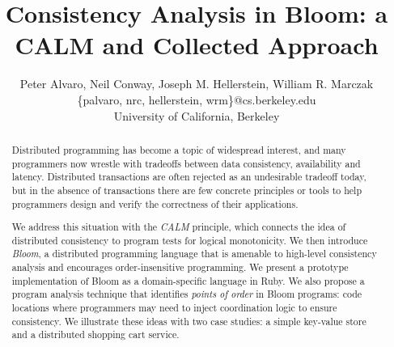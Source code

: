 \documentclass{sig-alternate}
\begin{document}
\title{Consistency Analysis in Bloom: a CALM and Collected Approach}

\author{
Peter Alvaro, Neil Conway, Joseph M. Hellerstein, William R. Marczak \vspace{12pt} \\
\{palvaro, nrc, hellerstein, wrm\}@cs.berkeley.edu \\
University of California, Berkeley
}

\maketitle

\begin{abstract}
  Distributed programming has become a topic of widespread interest, and many
  programmers now wrestle with tradeoffs between data consistency, availability
  and latency.  Distributed transactions are often rejected as an undesirable
  tradeoff today, but in the absence of transactions there are few concrete
  principles or tools to help programmers design and verify the correctness of
  their applications.

  We address this situation with the \emph{CALM} principle, which connects the
  idea of distributed consistency to program tests for logical monotonicity.  We
  then introduce \emph{Bloom}, a distributed programming language that is
  amenable to high-level consistency analysis and encourages order-insensitive
  programming.  We present a prototype implementation of Bloom as a
  domain-specific language in Ruby. We also propose a program analysis technique
  that identifies {\em points of order} in Bloom programs: code locations where
  programmers may need to inject coordination logic to ensure consistency.  We
  illustrate these ideas with two case studies: a simple key-value store and a
  distributed shopping cart service.
\end{abstract}














\appendix

\end{document}
